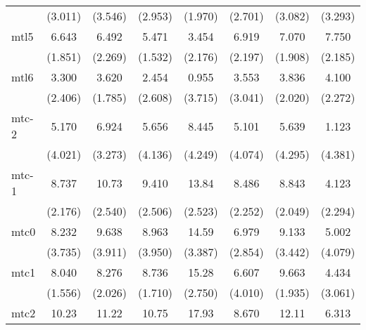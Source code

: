 \documentclass{article}
\begin{document}
{\begin{longtable}{l*{7}{c}}
                &  (3.011)         &  (3.546)         &  (2.953)         &  (1.970)         &  (2.701)         &  (3.082)         &  (3.293)         \\
mtl5            &    6.643\sym{*}  &    6.492\sym{*}  &    5.471\sym{*}  &    3.454         &    6.919\sym{*}  &    7.070\sym{*}  &    7.750\sym{*}  \\
                &  (1.851)         &  (2.269)         &  (1.532)         &  (2.176)         &  (2.197)         &  (1.908)         &  (2.185)         \\
mtl6            &    3.300         &    3.620         &    2.454         &    0.955         &    3.553         &    3.836         &    4.100         \\
                &  (2.406)         &  (1.785)         &  (2.608)         &  (3.715)         &  (3.041)         &  (2.020)         &  (2.272)         \\
mtc-2           &    5.170         &    6.924         &    5.656         &    8.445         &    5.101         &    5.639         &    1.123         \\
                &  (4.021)         &  (3.273)         &  (4.136)         &  (4.249)         &  (4.074)         &  (4.295)         &  (4.381)         \\
mtc-1           &    8.737\sym{*}  &    10.73\sym{**} &    9.410\sym{*}  &    13.84\sym{**} &    8.486\sym{*}  &    8.843\sym{**} &    4.123         \\
                &  (2.176)         &  (2.540)         &  (2.506)         &  (2.523)         &  (2.252)         &  (2.049)         &  (2.294)         \\
mtc0            &    8.232         &    9.638         &    8.963         &    14.59\sym{**} &    6.979         &    9.133\sym{*}  &    5.002         \\
                &  (3.735)         &  (3.911)         &  (3.950)         &  (3.387)         &  (2.854)         &  (3.442)         &  (4.079)         \\
mtc1            &    8.040\sym{**} &    8.276\sym{**} &    8.736\sym{**} &    15.28\sym{**} &    6.607         &    9.663\sym{**} &    4.434         \\
                &  (1.556)         &  (2.026)         &  (1.710)         &  (2.750)         &  (4.010)         &  (1.935)         &  (3.061)         \\
mtc2            &    10.23         &    11.22\sym{*}  &    10.75         &    17.93\sym{*}  &    8.670         &    12.11         &    6.313         \\

\end{longtable}}
\end{document}
